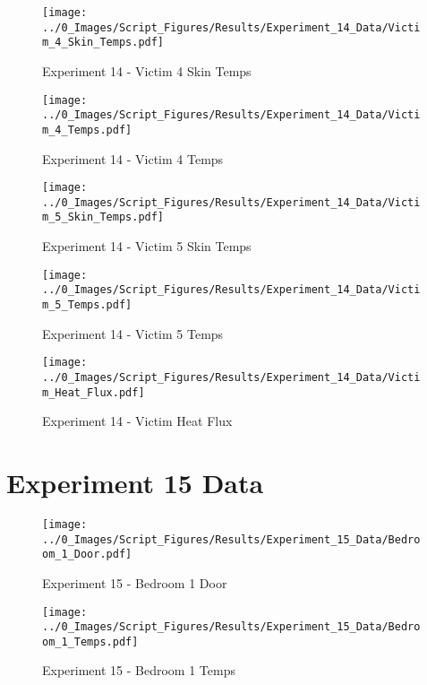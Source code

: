 	\begin{figure}[H]
		\centering
		\texttt{[image: ../0\_Images/Script\_Figures/Results/Experiment\_14\_Data/Victim\_4\_Skin\_Temps.pdf]}
		\caption[]{Experiment 14 - Victim 4 Skin Temps}
	\end{figure}
 
	\clearpage

	\begin{figure}[H]
		\centering
		\texttt{[image: ../0\_Images/Script\_Figures/Results/Experiment\_14\_Data/Victim\_4\_Temps.pdf]}
		\caption[]{Experiment 14 - Victim 4 Temps}
	\end{figure}
 

	\begin{figure}[H]
		\centering
		\texttt{[image: ../0\_Images/Script\_Figures/Results/Experiment\_14\_Data/Victim\_5\_Skin\_Temps.pdf]}
		\caption[]{Experiment 14 - Victim 5 Skin Temps}
	\end{figure}
 
	\clearpage

	\begin{figure}[H]
		\centering
		\texttt{[image: ../0\_Images/Script\_Figures/Results/Experiment\_14\_Data/Victim\_5\_Temps.pdf]}
		\caption[]{Experiment 14 - Victim 5 Temps}
	\end{figure}
 

	\begin{figure}[H]
		\centering
		\texttt{[image: ../0\_Images/Script\_Figures/Results/Experiment\_14\_Data/Victim\_Heat\_Flux.pdf]}
		\caption[]{Experiment 14 - Victim Heat Flux}
	\end{figure}
 
	\clearpage

\clearpage		\large
\section{Experiment 15 Data} \label{App:Exp15Results} 

	\begin{figure}[H]
		\centering
		\texttt{[image: ../0\_Images/Script\_Figures/Results/Experiment\_15\_Data/Bedroom\_1\_Door.pdf]}
		\caption[]{Experiment 15 - Bedroom 1 Door}
	\end{figure}
 

	\begin{figure}[H]
		\centering
		\texttt{[image: ../0\_Images/Script\_Figures/Results/Experiment\_15\_Data/Bedroom\_1\_Temps.pdf]}
		\caption[]{Experiment 15 - Bedroom 1 Temps}
	\end{figure}
 
